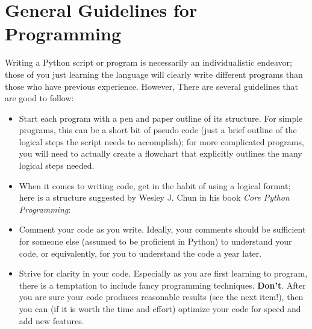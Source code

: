 \chapter{General Guidelines for Programming}
\label{sec-guidelines}
Writing a Python script or program is necessarily an individualistic endeavor; those of you just learning the language will clearly write different programs than those who have previous experience. However, There are several guidelines that are good to follow: 
\begin{itemize}
	\item Start each program with a pen and paper outline of its structure. For simple programs, this can be a short bit of pseudo code (just a brief outline of the logical steps the script needs to accomplish); for more complicated programs, you will need to actually create a flowchart that explicitly outlines the many logical steps needed. 
	\item When it comes to writing code, get in the habit of using a logical format; here is a structure suggested by Wesley J. Chun in his book \textit{Core Python Programming}\cite{chun2007}:
	
	\item Comment your code as you write. Ideally, your comments should be sufficient for someone else (assumed to be proficient in Python) to understand your code, or equivalently, for you to understand the code a year later.
	
	\item Strive for clarity in your code. Especially as you are first learning to program, there is a temptation to include fancy programming techniques. \textbf{Don't}. After you are sure your code produces reasonable results (see the next item!), then you can (if it is worth the time and effort) optimize your code for speed and add new features. 
	

\end{itemize}
